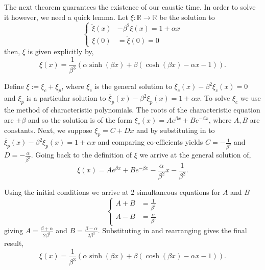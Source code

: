 \documentclass[a4paper,12pt,draft]{report}
\begin{document}
The next theorem guarantees the existence of our caustic time.  In order to solve it however, we need a quick lemma.
\lemma
{
Let $\xi :\mathbb{R} \to \mathbb{R}$ be the solution to
$$
\left\{
\begin{aligned}
\ddot{\xi}(x) & - \beta^2\xi(x) = 1 + \alpha x\\
\xi(0) & = \dot{\xi}(0) = 0
\end{aligned}
\right.
$$
then, $\xi$ is given explicitly by,
$$
\xi(x) = \frac{1}{\beta^3}(\alpha\sinh(\beta x) + \beta(\cosh(\beta x) - \alpha x - 1)).
$$
}
\proof
{
Define $\xi := \xi_c + \xi_p$, where $\xi_c$ is the general solution to $\ddot{\xi_c}(x) - \beta^2\xi_c(x) = 0$ and $\xi_p$ is a particular solution to $\ddot{\xi_p}(x) - \beta^2\xi_p(x) = 1 + \alpha x$.  To solve $\xi_c$ we use the method of characteristic polynomials.  The roots of the characteristic equation are $\pm\beta$ and so the solution is of the form $\xi_c(x) = Ae^{\beta x} + Be^{-\beta x}$, where $A, B$ are constants.  Next, we suppose $\xi_p = C + Dx$ and by substituting in to $\ddot{\xi_p}(x) - \beta^2\xi_p(x) = 1 + \alpha x$ and comparing co-efficients yields $C = -\frac{1}{\beta^2}$ and $D = -\frac{\alpha}{\beta^2}$.  Going back to the definition of $\xi$ we arrive at the general solution of,
$$
\xi(x) = Ae^{\beta x} + Be^{-\beta x} - \frac{\alpha}{\beta^2}x - \frac{1}{\beta^2}.
$$

Using the initial conditions we arrive at 2 simultaneous equations for $A$ and $B$
$$
\left\{
\begin{aligned}
A + B & = \frac{1}{\beta^2}\\
A - B & = \frac{\alpha}{\beta^3}
\end{aligned}
\right.
$$
giving $A = \frac{\beta + \alpha}{2\beta^3}$ and $B = \frac{\beta - \alpha}{2\beta^3}$.  Substituting in and rearranging gives the final result,
$$
\xi(x) = \frac{1}{\beta^3}(\alpha\sinh(\beta x) + \beta(\cosh(\beta x) - \alpha x - 1)).
$$

\qedhere
}
\end{document}
